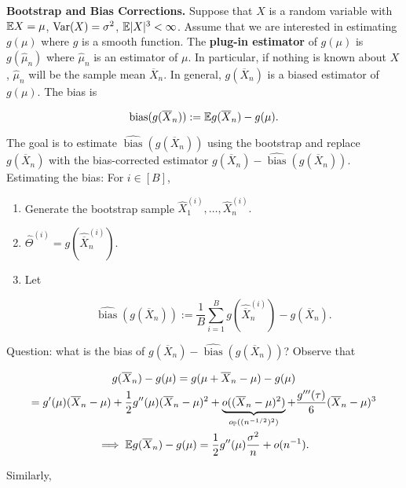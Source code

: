\textbf{Bootstrap and Bias Corrections.} Suppose that \(X\) is a random variable with \(\E X = \mu\), \(\Var(X) = \sigma^2\), \(\E |X|^3 < \infty\). Assume that we are interested in estimating \(g(\mu)\) where \(g\) is a smooth function. The \textbf{plug-in estimator} of \(g(\mu)\) is \(g(\hat{\mu}_n)\) where \(\hat{\mu}_n\) is an estimator of \(\mu\). In particular, if nothing is known about \(X\), \(\hat{\mu}_n\) will be the sample mean \(\overline{X}_n\). In general, \(g(\overline{X}_n)\) is a biased estimator of \(g(\mu)\). The bias is 

\[
\operatorname{bias}(g(\overline{X}_n)) := \E g(\overline{X}_n) - g(\mu).
\]

The goal is to estimate \(\widehat{\operatorname{bias}}(g(\overline{X}_n))\) using the bootstrap and replace \(g(\overline{X}_n)\) with the bias-corrected estimator \(g(\overline{X}_n) - \widehat{\operatorname{bias}}(g(\overline{X}_n))\). Estimating the bias: For \(i \in [B]\),

\begin{enumerate}

\item Generate the bootstrap sample \(\hat{X}_1^{(i)}, \ldots, \hat{X}_n^{(i)}.\)

\item \(\hat{\Theta}^{(i)} = g \left( \widehat{\overline{X}}_n ^{(i)} \right)\).

\item Let 

\[
\widehat{\operatorname{bias}}(g(\overline{X}_n)) := \frac{1}{B} \sum_{i=1}^B  g \left( \widehat{\overline{X}}_n ^{(i)} \right) - g( \overline{X}_n).
\]

\end{enumerate}

Question: what is the bias of \(g(\overline{X}_n) - \widehat{\operatorname{bias}}(g(\overline{X}_n))\)? Observe that

\begin{multline*}
g(\overline{X}_n) - g(\mu) = g(\mu + \overline{X}_n - \mu) - g(\mu) 
\\ = g'(\mu) (\overline{X}_n - \mu) + \frac{1}{2} g''(\mu)(\overline{X}_n - \mu)^2 + \underbrace{o(( \overline{X}_n-\mu)^2)}_{o_{\mathbb{P}}((n^{-1/2})^2)} + \frac{g'''(\tau)}{6}(\overline{X}_n - \mu)^3
\\ \implies \E g(\overline{X}_n) - g(\mu) = \frac{1}{2} g''(\mu) \frac{\sigma^2}{n} + o(n^{-1}).
\end{multline*}

Similarly,

